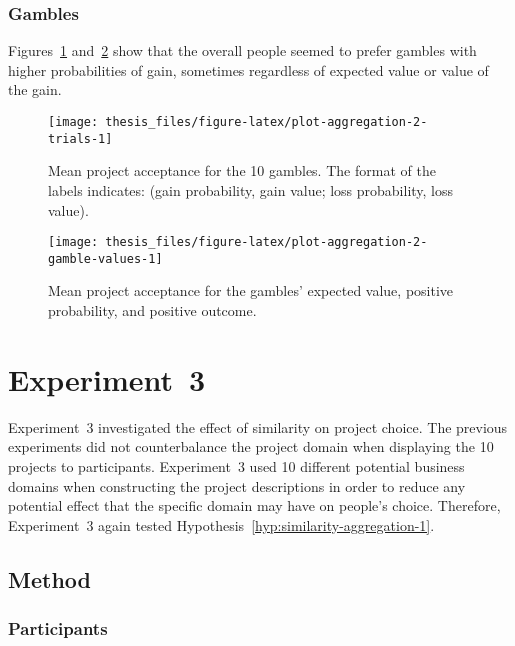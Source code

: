 \documentclass[a4paper, nobind]{templates/ociamthesis}
\theoremstyle{definition}
\theoremstyle{definition}
\theoremstyle{definition}
\theoremstyle{definition}
\theoremstyle{remark}
\begin{document}
\subsubsection{Gambles}

Figures~\ref{fig:plot-aggregation-2-trials}
and~\ref{fig:plot-aggregation-2-gamble-values} show that the overall people
seemed to prefer gambles with higher probabilities of gain, sometimes regardless
of expected value or value of the gain.



\begin{figure}
\texttt{[image: thesis\_files/figure-latex/plot-aggregation-2-trials-1]} \caption{Mean project acceptance for the 10 gambles. The format of the labels indicates: (gain probability, gain value; loss probability, loss value).}\label{fig:plot-aggregation-2-trials}
\end{figure}



\begin{figure}
\texttt{[image: thesis\_files/figure-latex/plot-aggregation-2-gamble-values-1]} \caption{Mean project acceptance for the gambles' expected value, positive probability, and positive outcome.}\label{fig:plot-aggregation-2-gamble-values}
\end{figure}

\hypertarget{aggregation-3}{%
\section{Experiment~3}\label{aggregation-3}}

Experiment~3 investigated the effect of similarity on project choice. The
previous experiments did not counterbalance the project domain when displaying
the 10 projects to participants. Experiment~3 used 10 different potential
business domains when constructing the project descriptions in order to reduce
any potential effect that the specific domain may have on people's choice.
Therefore, Experiment~3 again tested
Hypothesis~\ref{hyp:similarity-aggregation-1}.

\subsection{Method}

\subsubsection{Participants}
\end{document}
